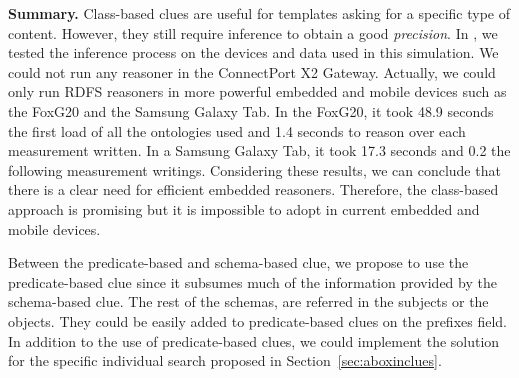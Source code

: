 



\medskip

\noindent\textbf{Summary.}
Class-based clues are useful for templates asking for a specific type of content.
However, they still require inference to obtain a good \emph{precision}.
In \citet{gomez-goiri_restful_2012}, we tested the inference process on the devices and data used in this simulation. %
We could not run any reasoner in the ConnectPort X2 Gateway.
Actually, we could only run RDFS reasoners in more powerful embedded and mobile devices such as the FoxG20 and the Samsung Galaxy Tab.
In the FoxG20, it took 48.9 seconds the first load of all the ontologies used and 1.4 seconds to reason over each measurement written.
In a Samsung Galaxy Tab, it took 17.3 seconds and 0.2 the following measurement writings.
Considering these results, we can conclude that there is a clear need for efficient embedded reasoners.
Therefore, the class-based approach is promising but it is impossible to adopt in current embedded and mobile devices.

Between the predicate-based and schema-based clue, we propose to use the predicate-based clue since it subsumes much of the information provided by the schema-based clue.
The rest of the schemas, are referred in the subjects or the objects. %
They could be easily added to predicate-based clues on the prefixes field.
In addition to the use of predicate-based clues, we could implement the solution for the specific individual search proposed in Section~\ref{sec:aboxinclues}.






